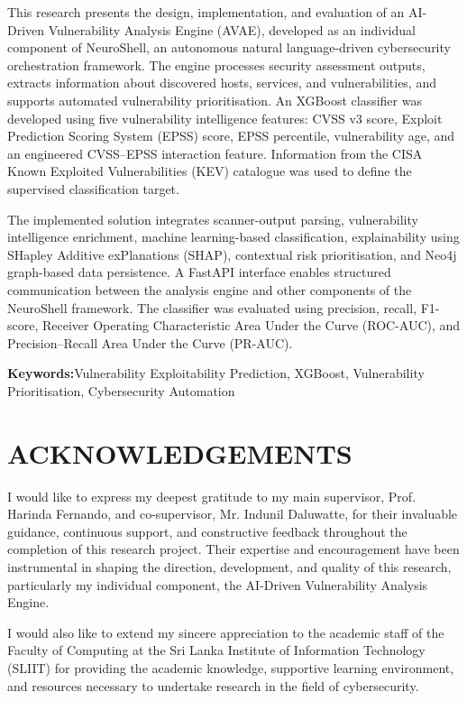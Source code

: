 \documentclass[
]{article}
\begin{document}
This research presents the design, implementation, and evaluation of an
AI-Driven Vulnerability Analysis Engine (AVAE), developed as an
individual component of NeuroShell, an autonomous natural
language-driven cybersecurity orchestration framework. The engine
processes security assessment outputs, extracts information about
discovered hosts, services, and vulnerabilities, and supports automated
vulnerability prioritisation. An XGBoost classifier was developed using
five vulnerability intelligence features: CVSS v3 score, Exploit
Prediction Scoring System (EPSS) score, EPSS percentile, vulnerability
age, and an engineered CVSS--EPSS interaction feature. Information from
the CISA Known Exploited Vulnerabilities (KEV) catalogue was used to
define the supervised classification target.

The implemented solution integrates scanner-output parsing,
vulnerability intelligence enrichment, machine learning-based
classification, explainability using SHapley Additive exPlanations
(SHAP), contextual risk prioritisation, and Neo4j graph-based data
persistence. A FastAPI interface enables structured communication
between the analysis engine and other components of the NeuroShell
framework. The classifier was evaluated using precision, recall,
F1-score, Receiver Operating Characteristic Area Under the Curve
(ROC-AUC), and Precision--Recall Area Under the Curve (PR-AUC).

\textbf{Keywords:}Vulnerability Exploitability Prediction, XGBoost,
Vulnerability Prioritisation, Cybersecurity Automation

\hypertarget{acknowledgements}{%
\section{ACKNOWLEDGEMENTS}\label{acknowledgements}}

I would like to express my deepest gratitude to my main supervisor,
Prof. Harinda Fernando, and co-supervisor, Mr. Indunil Daluwatte, for
their invaluable guidance, continuous support, and constructive feedback
throughout the completion of this research project. Their expertise and
encouragement have been instrumental in shaping the direction,
development, and quality of this research, particularly my individual
component, the AI-Driven Vulnerability Analysis Engine.

I would also like to extend my sincere appreciation to the academic
staff of the Faculty of Computing at the Sri Lanka Institute of
Information Technology (SLIIT) for providing the academic knowledge,
supportive learning environment, and resources necessary to undertake
research in the field of cybersecurity.
\end{document}
